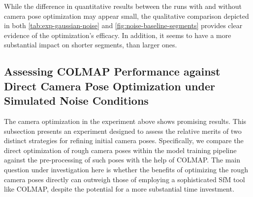 


While the difference in quantitative results between the runs with and without camera pose optimization may appear small, the qualitative comparison depicted in both \autoref{tab:exp-gaussian-noise} and \autoref{fig:noise-baseline-segments} provides clear evidence of the optimization's efficacy. In addition, it seems to have a more substantial impact on shorter segments, than larger ones.

\begin{comment}
Information about GNSS-error
https://junipersys.com/support/article/6614#:~:text=Just%
\end{comment}



\subsection{Assessing COLMAP Performance against Direct Camera Pose Optimization under Simulated Noise Conditions}

The camera optimization in the experiment above shows promising results. This subsection presents an experiment designed to assess the relative merits of two distinct strategies for refining initial camera poses. Specifically, we compare the direct optimization of rough camera poses within the model training pipeline against the pre-processing of such poses with the help of COLMAP. The main question under investigation here is whether the benefits of optimizing the rough camera poses directly can outweigh those of employing a sophisticated SfM tool like COLMAP, despite the potential for a more substantial time investment.

